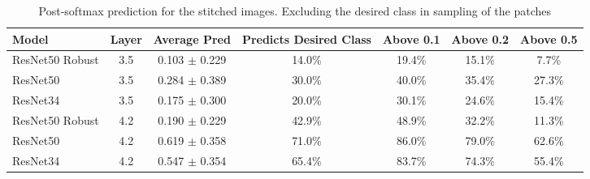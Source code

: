 \begin{table*}[t]
\caption{Post-softmax prediction for the stitched images. Excluding the desired class in sampling of the patches}
\label{tab:data_vis_test_exclude_target}
\vskip 0.15in
\begin{center}
\begin{small}
\begin{sc}
\begin{tabular}{lcccccc}
\toprule
Model & Layer & Average Pred & Predicts Desired Class & Above 0.1 & Above 0.2 & Above 0.5 \\
\midrule
ResNet50 Robust   & 3.5 & 0.103 $\pm$ 0.229 & 14.0\% & 19.4\% & 15.1\% & 7.7\% \\
ResNet50    & 3.5 & 0.284 $\pm$ 0.389 & 30.0\% & 40.0\% & 35.4\% & 27.3\% \\
ResNet34    & 3.5 & 0.175 $\pm$ 0.300 & 20.0\% & 30.1\% & 24.6\% & 15.4\% \\

ResNet50 Robust   & 4.2 & 0.190 $\pm$ 0.229 & 42.9\% & 48.9\% & 32.2\% & 11.3\% \\
ResNet50    & 4.2 & 0.619 $\pm$ 0.358 & 71.0\% & 86.0\% & 79.0\% & 62.6\% \\
ResNet34    & 4.2 & 0.547 $\pm$ 0.354 & 65.4\% & 83.7\% & 74.3\% & 55.4\% \\
\bottomrule
\end{tabular}
\end{sc}
\end{small}
\end{center}
\vskip -0.1in
\end{table*}